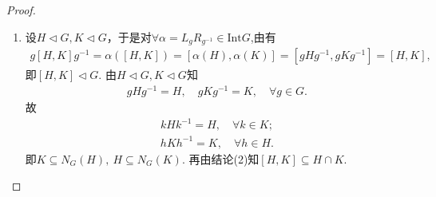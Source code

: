 \documentclass[../../main.tex]{subfiles}%
\begin{document}
\begin{proof}
\begin{enumerate}[(1)]
再证$[H, K] \subseteq H\iff K \subseteq N_G(H)$.
若$[H, K] \subseteq H$，则
\begin{align*}
[h, k] \in H,\quad [h^{-1}, k^{-1}] \in H,\quad \forall k \in K,\ h \in H.
\end{align*}
对$\forall k \in K$，设$h \in H$，则由$[h, k] \in H$知存在$h_1 \in H$，使
\begin{align*}
h^{-1}k^{-1}hk = h_1 \Longleftrightarrow hk = khh_1 \Longleftrightarrow h = khh_1k^{-1} \in kHk^{-1},
\end{align*}
故$H \subseteq kHk^{-1}$. 再设$khk^{-1} \in kHk^{-1}$，则由$[h^{-1}, k^{-1}] \in H$知存在$h_2 \in H$，使
\begin{align*}
hkh^{-1}k^{-1} = h_1 \Longleftrightarrow khk^{-1} = h^{-1}h_1 \in H,
\end{align*}
故$kHk^{-1} \subseteq H$. 因此$kHk^{-1} = H$，$\forall k \in K$. 即$k \in N_G(H)$，$\forall k \in K$. 故$K \subseteq N_G(H)$.

反之，若$K \subseteq N_G(H)$，对$\forall h \in H,\ k \in K$，有$kHk^{-1} = H$，从而存在$h_1 \in H,\ k_1 \in K$，使
\begin{align*}
h = k_1h_1k_1^{-1}.
\end{align*}
于是
\begin{align*}
[h, k] = h^{-1}k^{-1}hk = h^{-1}k^{-1}k_1h_1k_1^{-1}k = h^{-1}(k^{-1}k_1)h_1(k^{-1}k_1)^{-1}.
\end{align*}
注意到$(k^{-1}k_1)h_1(k^{-1}k_1)^{-1} \in kHk^{-1}$，所以存在$h_2 \in H$，使$(k^{-1}k_1)h_1(k^{-1}k_1)^{-1} = h_2$. 从而
\begin{align*}
[h, k] = h^{-1}(k^{-1}k_1)h_1(k^{-1}k_1)^{-1} = h^{-1}h_2 \in H.
\end{align*}
故$[H, K] \subseteq H$.

\item 设$H \lhd G, K \lhd G$，于是对$\forall \alpha=L_gR_{g^{-1}} \in \mathrm{Int}G$,由有
\begin{align*}
g[H,K]g^{-1} = \alpha([H, K]) = [\alpha(H), \alpha(K)] = [gHg^{-1}, gKg^{-1}] = [H, K],
\end{align*}
即$[H, K] \lhd G$. 由$H \lhd G, K \lhd G$知
\begin{align*}
gHg^{-1} = H,\quad gKg^{-1} = K,\quad \forall g \in G.
\end{align*}
故
\begin{align*}
kHk^{-1} = H,\quad \forall k \in K;
\end{align*}
\begin{align*}
hKh^{-1} = K,\quad \forall h \in H.
\end{align*}
即$K \subseteq N_G(H),\ H \subseteq N_G(K)$. 再由结论(2)知$[H, K] \subseteq H \cap K$.


\end{enumerate}
\end{proof}
\end{document}
